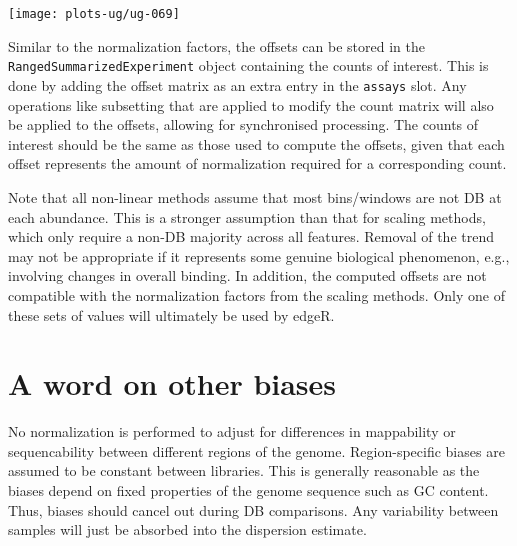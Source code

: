 \documentclass[12pt]{report}
\renewenvironment{Schunk}{\vspace{0pt}}{\vspace{0pt}}
\newcommand{\edger}{edgeR}
\newcommand{\code}[1]{{\small\texttt{#1}}}
\begin{document}
\begin{center}
\texttt{[image: plots-ug/ug-069]}
\end{center}

Similar to the normalization factors, the offsets can be stored in the \code{RangedSummarizedExperiment} object containing the counts of interest.
This is done by adding the offset matrix as an extra entry in the \code{assays} slot.
Any operations like subsetting that are applied to modify the count matrix will also be applied to the offsets, allowing for synchronised processing.
The counts of interest should be the same as those used to compute the offsets, given that each offset represents the amount of normalization required for a corresponding count.

\begin{Schunk}
\end{Schunk}

Note that all non-linear methods assume that most bins/windows are not DB at each abundance. 
This is a stronger assumption than that for scaling methods, which only require a non-DB majority across all features.
Removal of the trend may not be appropriate if it represents some genuine biological phenomenon, e.g., involving changes in overall binding. 
In addition, the computed offsets are not compatible with the normalization factors from the scaling methods.
Only one of these sets of values will ultimately be used by \edger{}.


\section{A word on other biases}
No normalization is performed to adjust for differences in mappability or sequencability between different regions of the genome. 
Region-specific biases are assumed to be constant between libraries. 
This is generally reasonable as the biases depend on fixed properties of the genome sequence such as GC content. 
Thus, biases should cancel out during DB comparisons.
Any variability between samples will just be absorbed into the dispersion estimate. 
\end{document}
